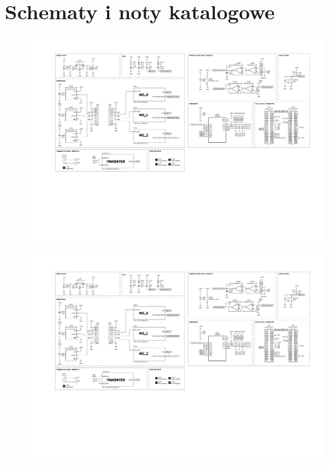 \chapter{Schematy i noty katalogowe}

\begin{figure}
    \includegraphics[width = \textwidth, trim=2cm 10cm 2cm 2cm, clip]{./figures/chapter_09/schemat_plytki.pdf}
\end{figure}

\begin{figure}
    \includegraphics[page = 2, width = \textwidth, trim=2cm 10cm 2cm 6cm, clip]{./figures/chapter_09/schemat_plytki.pdf}
\end{figure}

